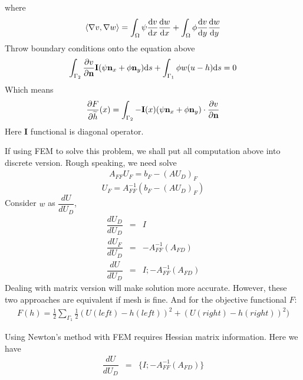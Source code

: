 \documentclass{note}
\begin{document}
where 
\begin{eqnarray*}
\langle \nabla v,\nabla w \rangle  = \int_{\Omega}\psi\frac{\mathrm{d} v}{\mathrm{d} x}\frac{\mathrm{d} w}{\mathrm{d} x} + \int_{\Omega}\phi\frac{\mathrm{d} v}{\mathrm{d} y}\frac{\mathrm{d} w}{\mathrm{d} y}
\end{eqnarray*}
Throw boundary conditions onto the equation above
\begin{eqnarray}
\int_{\Gamma_2} \frac{\partial v}{\partial \mathbf{n}} \mathbf{I} (\psi\mathbf{n}_x + \phi\mathbf{n}_y) \mathrm{d} s +  \int_{\Gamma_1} \phi w(u-h)\mathrm{d} s = 0
\end{eqnarray}
Which means
\begin{eqnarray}
\frac{\partial F}{\partial \widetilde{h}}(x) =\int_{\Gamma_2} -\mathbf{I}(x)(\psi \mathbf{n}_x + \phi \mathbf{n}_y )\cdot \frac{\partial v}{\partial \mathbf{n}}
\end{eqnarray}
Here $\mathbf{I}$ functional is diagonal operator.
\begin{remark}
If using FEM to solve this problem, we shall put all computation above into discrete version. Rough speaking, we need solve 
\begin{eqnarray}
A_{FF} U_F = b_F - (A U_D)_F
\end{eqnarray}
\begin{equation}
U_F = A_{FF}^{-1}(b_F - (AU_D)_F)
\end{equation}
Consider $w$ as $\dfrac{dU}{dU_D}$,
\begin{eqnarray}
\dfrac{dU_D}{d U_D} &=& I\\
\dfrac{dU_F}{d U_D} &=& -A_{FF}^{-1}(A_{FD})\\
\dfrac{dU}{d U_D}   &=& I ; -A_{FF}^{-1}(A_{FD})
\end{eqnarray}
Dealing with matrix version will make solution more accurate. However, these two approaches are equivalent if mesh is fine. And for the objective functional $F$:
\begin{eqnarray}
F(h) = \frac{1}{2} \sum_{\Gamma_1} \frac{1}{2}(U(left) - h(left))^2 + (U(right) - h(right))^2)
\end{eqnarray}
\end{remark}

\begin{remark}
Using Newton's method with FEM requires Hessian matrix information. Here we have 
\begin{eqnarray}
\dfrac{dU}{d U_D}   &=& \{I ; -A_{FF}^{-1}(A_{FD})\}
\end{eqnarray}
\end{remark}
\end{document}
